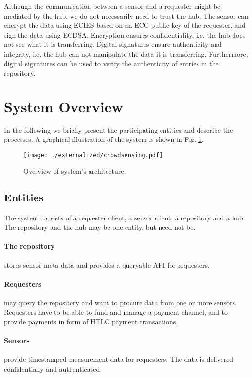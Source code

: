 Although the communication between a sensor and a requester might be mediated by the hub, we do not necessarily need to trust the hub. The sensor can encrypt the data using \ac{ECIES} based on an \ac{ECC} public key of the requester, and sign the data using \ac{ECDSA}. Encryption ensures confidentiality, i.e. the hub does not see what it is transferring. Digital signatures ensure authenticity and integrity, i.e. the hub can not manipulate the data it is transferring. 
Furthermore, digital signatures can be used to verify the authenticity of entries in the repository.

\section{System Overview}
\label{sec:trustlessoverview}

In the following we briefly present the participating entities and describe the processes. A graphical illustration of the system is shown in Fig. \ref{fig:architecture}.

 \begin{figure}
 \texttt{[image: ./externalized/crowdsensing.pdf]}
 \caption{Overview of system's architecture.}
 \label{fig:architecture}
 \end{figure}

\subsection{Entities}

The system consists of a requester client, a sensor client, a repository and a hub. The repository and the hub may be one entity, but need not be. 

\paragraph{The repository} stores sensor meta data and provides a queryable \ac{API} for requesters.

\paragraph{Requesters} may query the repository and want to procure data from one or more sensors. Requesters have to be able to fund and manage a payment channel, and to provide payments in form of \ac{HTLC} payment transactions.

\paragraph{Sensors} provide timestamped measurement data for requesters. The data is delivered confidentially and authenticated.

